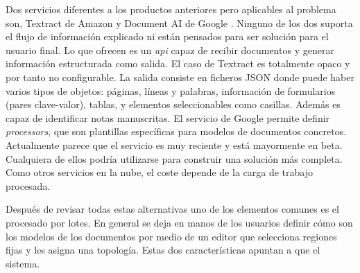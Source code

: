 Dos servicios diferentes a los productos anteriores pero aplicables al problema son, Textract de Amazon \cite{solucionesComerciales_amazon_textract} y Document AI de Google \cite{solucionesComerciales_google_documentAI}. Ninguno de los dos suporta el flujo de información explicado ni están pensados para ser solución para el usuario final. Lo que ofrecen es un \emph{\acrlong{api}} capaz de recibir documentos y generar información estructurada como salida. El caso de Textract es totalmente opaco y por tanto no configurable. La salida consiste en ficheros JSON donde puede haber varios tipos de objetos: páginas, líneas y palabras, información de formularios (pares clave-valor), tablas, y elementos seleccionables como casillas. Además es capaz de identificar notas manuscritas. El servicio de Google permite definir \emph{processors}, que son plantillas específicas para modelos de documentos concretos. Actualmente parece que el servicio es muy reciente y está mayormente en beta. Cualquiera de ellos podría utilizarse para construir una solución más completa. Como otros servicios en la nube, el coste depende de la carga de trabajo procesada.

Después de revisar todas estas alternativas uno de los elementos comunes es el procesado por lotes. En general se deja en manos de los usuarios definir cómo son los modelos de los documentos por medio de un editor que selecciona regiones fijas y les asigna una topología. Estas dos características apuntan a que el sistema.


